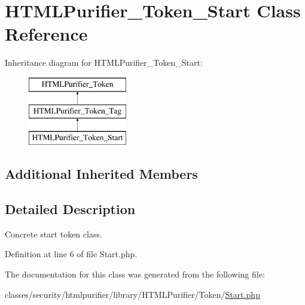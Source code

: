\hypertarget{classHTMLPurifier__Token__Start}{\section{H\+T\+M\+L\+Purifier\+\_\+\+Token\+\_\+\+Start Class Reference}
\label{classHTMLPurifier__Token__Start}
}
Inheritance diagram for H\+T\+M\+L\+Purifier\+\_\+\+Token\+\_\+\+Start\+:\begin{figure}[H]
\begin{center}
\leavevmode
\includegraphics[height=3.000000cm]{classHTMLPurifier__Token__Start}
\end{center}
\end{figure}
\subsection*{Additional Inherited Members}


\subsection{Detailed Description}
Concrete start token class. 

Definition at line 6 of file Start.\+php.



The documentation for this class was generated from the following file\+:\begin{DoxyCompactItemize}
\item 
classes/security/htmlpurifier/library/\+H\+T\+M\+L\+Purifier/\+Token/\hyperlink{Start_8php}{Start.\+php}\end{DoxyCompactItemize}
